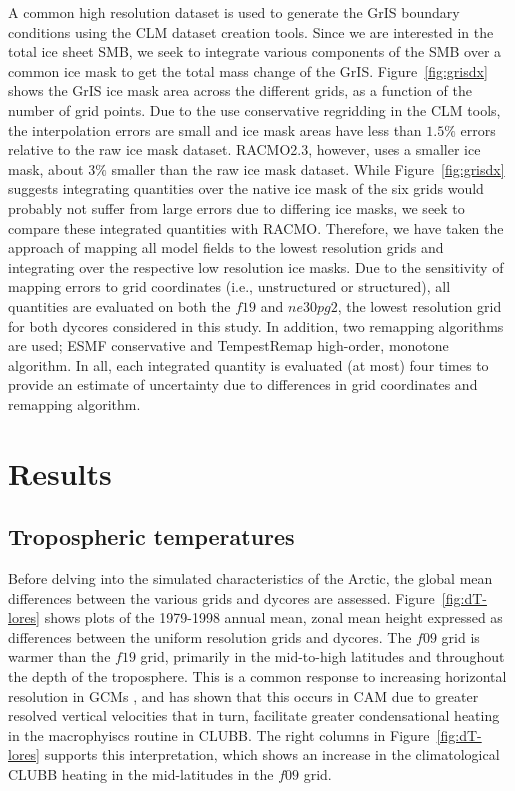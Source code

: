 \documentclass[draft]{agujournal2019}
\begin{document}
A common high resolution dataset is used to generate the GrIS boundary conditions using the CLM dataset creation tools. Since we are interested in the total ice sheet SMB, we seek to integrate various components of the SMB over a common ice mask to get the total mass change of the GrIS. Figure~\ref{fig:grisdx} shows the GrIS ice mask area across the different grids, as a function of the number of grid points. Due to the use conservative regridding in the CLM tools, the interpolation errors are small and ice mask areas have less than $1.5\%$ errors relative to the raw ice mask dataset. RACMO2.3, however, uses a smaller ice mask, about $3\%$ smaller than the raw ice mask dataset. While Figure~\ref{fig:grisdx} suggests integrating quantities over the native ice mask of the six grids would probably not suffer from large errors due to differing ice masks, we seek to compare these integrated quantities with RACMO. Therefore, we have taken the approach of mapping all model fields to the lowest resolution grids and integrating over the respective low resolution ice masks. Due to the sensitivity of mapping errors to grid coordinates (i.e., unstructured or structured), all quantities are evaluated on both the $f19$ and $ne30pg2$, the lowest resolution grid for both dycores considered in this study. In addition, two remapping algorithms are used; ESMF conservative and TempestRemap high-order, monotone algorithm. In all, each integrated quantity is evaluated (at most) four times to provide an estimate of uncertainty due to differences in grid coordinates and remapping algorithm.

\section{Results}\label{sec:results}

\subsection{Tropospheric temperatures}

Before delving into the simulated characteristics of the Arctic, the global mean differences between the various grids and dycores are assessed. Figure~\ref{fig:dT-lores} shows plots of the 1979-1998 annual mean, zonal mean height expressed as differences between the uniform resolution grids and dycores. The $f09$ grid is warmer than the $f19$ grid, primarily in the mid-to-high latitudes and throughout the depth of the troposphere. This is a common response to increasing horizontal resolution in GCMs \cite{PS2002CD,RETAL2006JC}, and \cite{HK2020QJRMS} has shown that this occurs in CAM due to greater resolved vertical velocities that in turn, facilitate greater condensational heating in the macrophyiscs routine in CLUBB. The right columns in Figure~\ref{fig:dT-lores} supports this interpretation, which shows an increase in the climatological CLUBB heating in the mid-latitudes in the $f09$ grid. 
\end{document}
